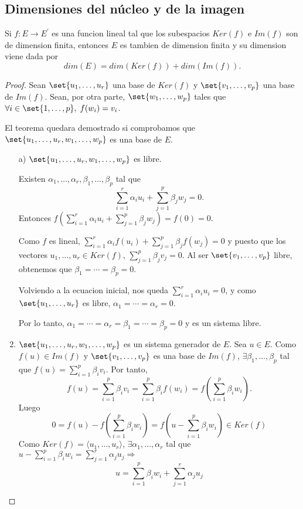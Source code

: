\subsection{Dimensiones del núcleo y de la imagen}
\begin{theorem}
	Si \(f \colon E \to E^\prime \) es una funcion lineal tal que los subespacios \(Ker(f)\) e \(Im(f )\) son de dimension finita, entonces \(E \) es tambien de dimension finita y su dimension viene dada por
	\[
		dim(E) = dim(Ker(f)) + dim(Im(f)).
	\]
\end{theorem}
\begin{proof}
	Sean \(\set{u_1,\ldots,u_r }\) una base de \(Ker(f )\) y \(\set{v_1,\ldots,v_p }\) una base de \(Im(f )\). Sean, por otra parte, \(\set{w_1,\ldots,w_p }\) tales que \(\forall i \in \set{1,\ldots,p}, \; f(w_i) = v_i \).

	El teorema quedara demostrado si comprobamos que \(\set{u_1,\ldots,u_r,w_1,\ldots,w_p }\) es una base de \(E \).
	\begin{enumerate}
		\item[a)] \(\set{u_1,\ldots,u_r,w_1,\ldots,w_p }\) es libre.

			Existen \(\alpha_{1}, \ldots, \alpha_r, \beta_1, \ldots, \beta_p \) tal que
			\[
				\sum_{i=1}^{r} \alpha_i u_i + \sum_{j=1}^{p } \beta_j w_j = 0.
			\]
			Entonces \(f(\sum_{i=1}^{r} \alpha_i u_i + \sum_{j=1}^{p } \beta_j w_j) = f(0) = 0 \).

			Como \(f \) es lineal, \(\sum_{i=1}^{r} \alpha_i f(u_i) + \sum_{j=1}^{p } \beta_j f(w_j) = 0\)  y puesto que los vectores \(u_1,\ldots,u_r \in Ker(f )\), \(\sum_{j =1}^{p } \beta_j v_j = 0 \). Al ser \(\set{v_1,\ldots,v_p }\) libre, obtenemos que \(\beta_1 = \cdots = \beta_p = 0 \).

			Volviendo a la ecuacion inicial, nos queda \(\sum_{i=1}^{r } \alpha_i u_i = 0 \), y como \(\set{u_1,\ldots,u_r }\) es libre, \(\alpha_1 = \cdots = \alpha_r = 0\).

			Por lo tanto, \(\alpha_1 = \cdots = \alpha_r = \beta_1 = \cdots = \beta_p = 0 \) y es un sistema libre.

		\item \(\set{u_1,\ldots,u_r,w_1,\ldots,w_p }\) es un sistema generador de \(E \). Sea \( u \in E \). Como \(f(u) \in Im(f)\) y \(\set{v_1,\ldots,v_p }\) es una base de \(Im(f )\), \(\exists \beta_1,\ldots,\beta_p \) tal que \(f(u ) = \sum_{i=1}^{p } \beta_i v_i \). Por tanto,
		      \[
			      f(u) = \sum_{i=1}^{p } \beta_i v_i = \sum_{i=1}^{p } \beta_i f(w_i) = f(\sum_{i=1}^{p } \beta_i w_i).
		      \]
		      Luego
		      \[
			      0 = f(u) - f(\sum_{i=1}^{p } \beta_i w_i ) = f(u - \sum_{i=1}^{p } \beta_i w_i) \in Ker(f)
		      \]
		      Como \(Ker(f) = \langle u_1, \ldots, u_r \rangle\), \(\exists \alpha_1, \ldots, \alpha_r \) tal que \(u - \sum_{i=1}^{p } \beta_i w_i = \sum_{j=1}^{r } \alpha_j u_j \Rightarrow \)
		      \[
			      u = \sum_{i=1}^{p } \beta_i w_i + \sum_{j=1}^{r } \alpha_j u_j
		      \]
	\end{enumerate}
\end{proof}

